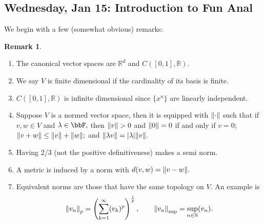 \documentclass[10pt, oneside]{article}
\newcommand{\bbR}{\mathbb{R}}
\newcommand{\bbN}{\mathbb{N}}
\theoremstyle{definition}
\newtheorem{rem}{Remark}
\begin{document}
\subsection{Wednesday, Jan 15: Introduction to Fun Anal}
We begin with a few (somewhat obvious) remarks:
\begin{rem}
    \begin{enumerate}
        \item The canonical vector spaces are $\bbR^d$ and $C([0,1], \bbR).$
        \item We say $V$ is finite dimensional if the cardinality of its basis is finite.
        \item $C([0,1], \bbR)$ is infinite dimensional since $\{x^n\}$ are linearly independent.
        \item Suppose $V$ is a normed vector space, then it is equipped with $\norm{\cdot}$ such that if $v,w \in V$ and $\lambda \in \bbF,$ then $\norm{v} >0$ and $\norm{0} = 0$ if and only if $v = 0;$ $\norm{v + w} \leq \norm{v} + \norm{w};$ and $\norm{\lambda v} = |\lambda|\norm{v}.$
        \item Having 2/3 (not the positive definitiveness) makes a semi norm. 
        \item A metric is induced by a norm with $d(v,w) = \norm{v - w}.$
        \item Equivalent norms are those that have the same topology on $V.$ An example is 
        \[\norm{v_n}_p = \left(\sum_{k=1}^\infty (v_k)^p\right)^{\frac{1}{p}}, \qquad \norm{v_n}_{\sup} = \sup_{n\in \bbN}(v_n).\]
    \end{enumerate}
\end{rem}
\end{document}
